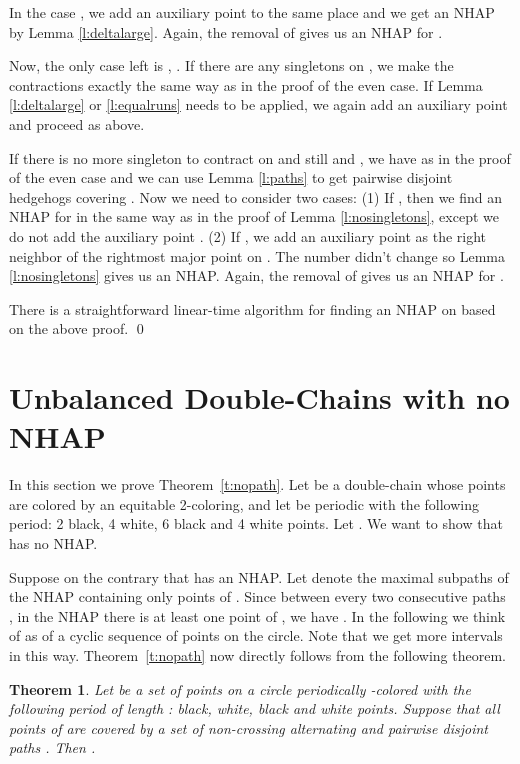 \documentclass[12pt]{article}
\newtheorem{theorem}{Theorem}[section]
\begin{document}
In the case , we add an auxiliary point  to the same place
and we get an NHAP by Lemma \ref{l:deltalarge}. Again, the removal of
 gives us an NHAP for . 

Now, the only case left is , .
If there are any singletons on , we make the contractions exactly the same
way as in the proof of the even case. If Lemma \ref{l:deltalarge} or
\ref{l:equalruns} needs to be applied, we again add an auxiliary point
 and proceed as above.

If there is no more singleton to contract on  and still  and
, we have  as in the proof of
the even case and we can use Lemma
\ref{l:paths} to get  pairwise disjoint hedgehogs covering . Now we need to consider two cases: (1) If , then we find
an NHAP for  in the same way as in the proof of Lemma
\ref{l:nosingletons}, except we do not add the auxiliary point .
(2) If , we add an auxiliary point  as the
right neighbor of the rightmost major point on . The number  didn't
change so Lemma \ref{l:nosingletons} gives us an NHAP. Again, the removal
of  gives us an NHAP for .

There is a straightforward linear-time algorithm for finding an NHAP
on  based on the above proof.
\qed


\section{Unbalanced Double-Chains with no NHAP}\label{s:nopath}
In this section we prove Theorem~\ref{t:nopath}.
Let  be a double-chain whose points are colored by an equitable 2-coloring, and let  be periodic with the following period: 2 black, 4 white, 6 black and 4 white points. 
Let . We want to show that  has no NHAP.

Suppose on the contrary that  has an NHAP.
Let  denote the maximal subpaths of the NHAP containing only points of . Since between every two consecutive paths ,  in the NHAP there is at least one point of , we have . In the following we think of  as of a cyclic sequence of points on the circle. Note that we get more intervals in this way. Theorem~\ref{t:nopath} now directly follows from the following theorem.


\begin{theorem}\label{t:circle_covering}
Let  be a set of points on a circle periodically -colored with the following period of length :
 black,  white,  black and  white points.
Suppose that all points of  are covered by a set of  non-crossing alternating and pairwise disjoint paths . Then .
\end{theorem}
\end{document}
